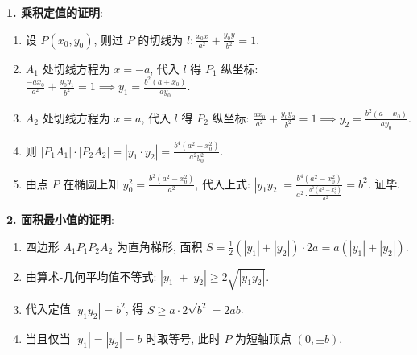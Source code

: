 \begin{proofbox}
\textbf{1. 乘积定值的证明}:
\begin{enumerate}
    \item 设 $P(x_0, y_0)$, 则过 $P$ 的切线为 $l: \frac{x_0x}{a^2} + \frac{y_0y}{b^2} = 1$.
    \item $A_1$ 处切线方程为 $x = -a$, 代入 $l$ 得 $P_1$ 纵坐标: $\frac{-ax_0}{a^2} + \frac{y_0y_1}{b^2} = 1 \implies y_1 = \frac{b^2(a+x_0)}{ay_0}$.
    \item $A_2$ 处切线方程为 $x = a$, 代入 $l$ 得 $P_2$ 纵坐标: $\frac{ax_0}{a^2} + \frac{y_0y_2}{b^2} = 1 \implies y_2 = \frac{b^2(a-x_0)}{ay_0}$.
    \item 则 $|P_1A_1| \cdot |P_2A_2| = |y_1 \cdot y_2| = \frac{b^4(a^2-x_0^2)}{a^2y_0^2}$.
    \item 由点 $P$ 在椭圆上知 $y_0^2 = \frac{b^2(a^2-x_0^2)}{a^2}$, 代入上式:
    $|y_1 y_2| = \frac{b^4(a^2-x_0^2)}{a^2 \cdot \frac{b^2(a^2-x_0^2)}{a^2}} = b^2$. 证毕.
\end{enumerate}

\textbf{2. 面积最小值的证明}:
\begin{enumerate}
    \item 四边形 $A_1P_1P_2A_2$ 为直角梯形, 面积 $S = \frac{1}{2}(|y_1| + |y_2|) \cdot 2a = a(|y_1| + |y_2|)$.
    \item 由算术-几何平均值不等式: $|y_1| + |y_2| \ge 2\sqrt{|y_1 y_2|}$.
    \item 代入定值 $|y_1 y_2| = b^2$, 得 $S \ge a \cdot 2\sqrt{b^2} = 2ab$.
    \item 当且仅当 $|y_1| = |y_2| = b$ 时取等号, 此时 $P$ 为短轴顶点 $(0, \pm b)$.
\end{enumerate}
\end{proofbox}